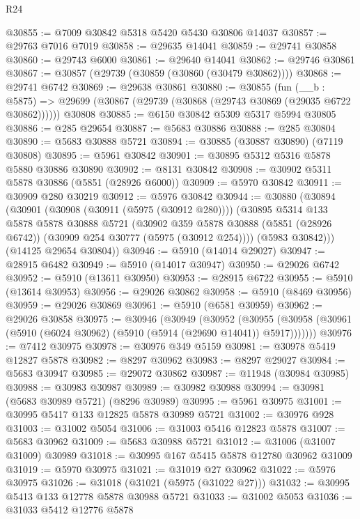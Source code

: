 \begin{lexlean}{R24}
\begin{coremodule}
@30855 := @7009 @30842 @5318 @5420 @5430 @30806 @14037
@30857 := @29763 @7016 @7019
@30858 := @29635 @14041
@30859 := @29741 @30858
@30860 := @29743 @6000
@30861 := @29640 @14041
@30862 := @29746 @30861
@30867 := @30857 (@29739 (@30859 (@30860 (@30479 @30862))))
@30868 := @29741 @6742
@30869 := @29638 @30861
@30880 := @30855
    (fun (__b : @5875) => @29699 (@30867 (@29739 (@30868 (@29743 @30869 (@29035 @6722 @30862))))))
    @30808
@30885 := @6150 @30842 @5309 @5317 @5994 @30805
@30886 := @285 @29654
@30887 := @5683 @30886
@30888 := @285 @30804
@30890 := @5683 @30888 @5721
@30894 := @30885 (@30887 @30890) (@7119 @30808)
@30895 := @5961 @30842
@30901 := @30895 @5312 @5316 @5878 @5880 @30886 @30890
@30902 := @8131 @30842
@30908 := @30902 @5311 @5878 @30886 (@5851 (@28926 @6000))
@30909 := @5970 @30842
@30911 := @30909 @280 @30219
@30912 := @5976 @30842
@30944 := @30880
    (@30894
      (@30901
        (@30908 (@30911 (@5975 (@30912 @280))))
        (@30895
          @5314
          @133
          @5878
          @5878
          @30888
          @5721
          (@30902
            @359
            @5878
            @30888
            (@5851 (@28926 @6742))
            (@30909 @254 @30777 (@5975 (@30912 @254))))
          (@5983 @30842)))
      (@14125 @29654 @30804))
@30946 := @5910 (@14014 @29027)
@30947 := @28915 @6482
@30949 := @5910 (@14017 @30947)
@30950 := @29026 @6742
@30952 := @5910 (@13611 @30950)
@30953 := @28915 @6722
@30955 := @5910 (@13614 @30953)
@30956 := @29026 @30862
@30958 := @5910 (@8469 @30956)
@30959 := @29026 @30869
@30961 := @5910 (@6581 @30959)
@30962 := @29026 @30858
@30975 := @30946
    (@30949
      (@30952
        (@30955 (@30958 (@30961 (@5910 (@6024 @30962) (@5910 (@5914 (@29690 @14041)) @5917)))))))
@30976 := @7412 @30975
@30978 := @30976 @349 @5159
@30981 := @30978 @5419 @12827 @5878
@30982 := @8297 @30962
@30983 := @8297 @29027
@30984 := @5683 @30947
@30985 := @29072 @30862
@30987 := @11948 (@30984 @30985)
@30988 := @30983 @30987
@30989 := @30982 @30988
@30994 := @30981 (@5683 @30989 @5721) (@8296 @30989)
@30995 := @5961 @30975
@31001 := @30995 @5417 @133 @12825 @5878 @30989 @5721
@31002 := @30976 @928
@31003 := @31002 @5054
@31006 := @31003 @5416 @12823 @5878
@31007 := @5683 @30962
@31009 := @5683 @30988 @5721
@31012 := @31006 (@31007 @31009) @30989
@31018 := @30995 @167 @5415 @5878 @12780 @30962 @31009
@31019 := @5970 @30975
@31021 := @31019 @27 @30962
@31022 := @5976 @30975
@31026 := @31018 (@31021 (@5975 (@31022 @27)))
@31032 := @30995 @5413 @133 @12778 @5878 @30988 @5721
@31033 := @31002 @5053
@31036 := @31033 @5412 @12776 @5878

\end{coremodule}
\end{lexlean}
